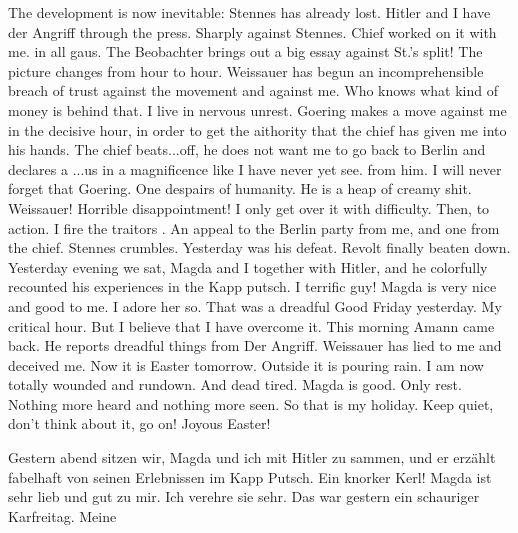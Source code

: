 The development is now inevitable: Stennes has already lost. Hitler and I have  der Angriff through the press. Sharply against Stennes. Chief worked on it with me.  in all gaus. The Beobachter brings out a big essay against St.'s split! The picture changes from hour to hour. Weissauer has begun an incomprehensible breach of trust against the movement and against me. Who knows what kind of money is behind that. I live in nervous unrest. Goering makes a move against me in the decisive hour, in order to get the aithority that the chief has given me into his hands. The chief beats...off, he does not want me to go back to Berlin and declares a \missing...us in a magnificence like I have never yet see. from him. I will never forget that Goering. One despairs of humanity. He is a heap of creamy shit. Weissauer! Horrible disappointment! I only get over it with difficulty. Then, to action. I fire the traitors . An appeal to the Berlin party from me, and one from the chief. Stennes crumbles. Yesterday was his defeat. Revolt finally beaten down. Yesterday evening we sat, Magda and I together with Hitler, and he colorfully recounted his experiences in the Kapp putsch. I terrific guy! Magda is very nice and good to me. I adore her so. That was a dreadful Good Friday yesterday. My critical hour. But I believe that I have overcome it. This morning Amann came back. He reports dreadful things from Der Angriff. Weissauer has lied to me and deceived me. Now it is Easter tomorrow. Outside it is pouring rain. I am now totally wounded and rundown. And dead tired. Magda is good. Only rest. Nothing more heard and nothing more seen. So that is my holiday. Keep quiet, don't think about it, go on! Joyous Easter!


Gestern abend sitzen wir, Magda und ich mit Hitler zu­ sammen, und er erzählt fabelhaft von seinen Erlebnissen im Kapp­ Putsch. Ein knorker Kerl! Magda ist sehr lieb und gut zu mir. Ich verehre sie sehr. Das war gestern ein schauriger Karfreitag. Meine
